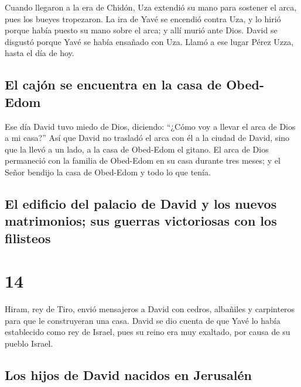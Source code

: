  Cuando llegaron a la era de Chidón, Uza extendió su mano
para sostener el arca, pues los bueyes tropezaron.  La
ira de Yavé se encendió contra Uza, y lo hirió porque había puesto su
mano sobre el arca; y allí murió ante Dios.  David se
disgustó porque Yavé se había ensañado con Uza. Llamó a ese lugar Pérez
Uzza, hasta el día de hoy.

\hypertarget{el-cajuxf3n-se-encuentra-en-la-casa-de-obed-edom}{%
\subsection{El cajón se encuentra en la casa de
Obed-Edom}\label{el-cajuxf3n-se-encuentra-en-la-casa-de-obed-edom}}

 Ese día David tuvo miedo de Dios, diciendo: ``¿Cómo voy
a llevar el arca de Dios a mi casa?''  Así que David no
trasladó el arca con él a la ciudad de David, sino que la llevó a un
lado, a la casa de Obed-Edom el gitano.  El arca de Dios
permaneció con la familia de Obed-Edom en su casa durante tres meses; y
el Señor bendijo la casa de Obed-Edom y todo lo que tenía.

\hypertarget{el-edificio-del-palacio-de-david-y-los-nuevos-matrimonios-sus-guerras-victoriosas-con-los-filisteos}{%
\subsection{El edificio del palacio de David y los nuevos matrimonios;
sus guerras victoriosas con los
filisteos}\label{el-edificio-del-palacio-de-david-y-los-nuevos-matrimonios-sus-guerras-victoriosas-con-los-filisteos}}

\hypertarget{section-13}{%
\section{14}\label{section-13}}

 Hiram, rey de Tiro, envió mensajeros a David con cedros,
albañiles y carpinteros para que le construyeran una casa.
 David se dio cuenta de que Yavé lo había establecido como
rey de Israel, pues su reino era muy exaltado, por causa de su pueblo
Israel.

\hypertarget{los-hijos-de-david-nacidos-en-jerusaluxe9n}{%
\subsection{Los hijos de David nacidos en
Jerusalén}\label{los-hijos-de-david-nacidos-en-jerusaluxe9n}}

